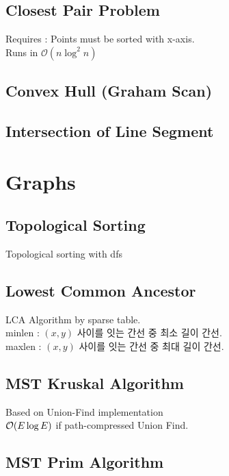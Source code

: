 \documentclass[landscape,8pt]{article}
\begin{document}
\begin{multicols}{2}
  \subsection{Closest Pair Problem}
    Requires : Points must be sorted with x-axis.\\
    Runs in $\mathcal{O}(n \log^2 n)$
    
  \subsection{Convex Hull (Graham Scan)}
    

  \subsection{Intersection of Line Segment}
    

\section{Graphs}
  \subsection{Topological Sorting}
  Topological sorting with dfs
    

  \subsection{Lowest Common Ancestor}
  LCA Algorithm by sparse table.\\
  minlen : $(x, y)$ 사이를 잇는 간선 중 최소 길이 간선.\\
  maxlen : $(x, y)$ 사이를 잇는 간선 중 최대 길이 간선.
    

  \subsection{MST Kruskal Algorithm}
  Based on Union-Find implementation\\
  $\order{E \log E}$ if path-compressed Union Find.
    

  \subsection{MST Prim Algorithm}
    


\end{multicols}
\end{document}
